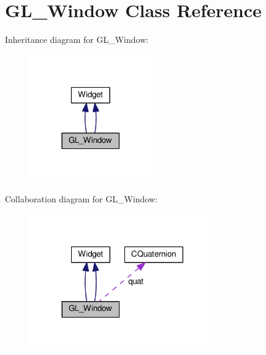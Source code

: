 \hypertarget{class_g_l___window}{}\section{G\+L\+\_\+\+Window Class Reference}
\label{class_g_l___window}


Inheritance diagram for G\+L\+\_\+\+Window\+:\nopagebreak
\begin{figure}[H]
\begin{center}
\leavevmode
\includegraphics[width=150pt]{class_g_l___window__inherit__graph}
\end{center}
\end{figure}


Collaboration diagram for G\+L\+\_\+\+Window\+:\nopagebreak
\begin{figure}[H]
\begin{center}
\leavevmode
\includegraphics[width=228pt]{class_g_l___window__coll__graph}
\end{center}
\end{figure}
